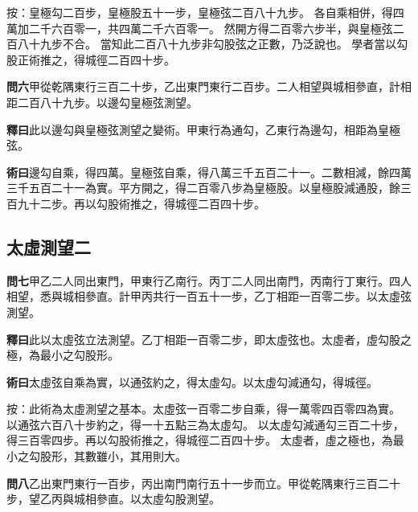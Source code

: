 \documentclass[12pt,a4paper]{article}
\newcommand{\Section}[1]{\subsection*{#1}}
\begin{document}
\noindent
按：皇極勾二百步，皇極股五十一步，皇極弦二百八十九步。
各自乘相併，得四萬加二千六百零一，共四萬二千六百零一。
然開方得二百零六步半，與皇極弦二百八十九步不合。
當知此二百八十九步非勾股弦之正數，乃泛說也。
學者當以勾股正術推之，得城徑二百四十步。

\vspace{0.5em}

\noindent\textbf{問六}\quad 甲從乾隅東行三百二十步，乙出東門東行二百步。二人相望與城相參直，計相距二百八十九步。以邊勾皇極弦測望。

\vspace{0.3em}

\noindent\textbf{釋曰}\quad 此以邊勾與皇極弦測望之變術。甲東行為通勾，乙東行為邊勾，相距為皇極弦。

\vspace{0.3em}

\noindent\textbf{術曰}\quad 邊勾自乘，得四萬。皇極弦自乘，得八萬三千五百二十一。二數相減，餘四萬三千五百二十一為實。平方開之，得二百零八步為皇極股。以皇極股減通股，餘三百九十二步。再以勾股術推之，得城徑二百四十步。

\Section{太虛測望二}

\noindent\textbf{問七}\quad 甲乙二人同出東門，甲東行乙南行。丙丁二人同出南門，丙南行丁東行。四人相望，悉與城相參直。計甲丙共行一百五十一步，乙丁相距一百零二步。以太虛弦測望。

\vspace{0.3em}

\noindent\textbf{釋曰}\quad 此以太虛弦立法測望。乙丁相距一百零二步，即太虛弦也。太虛者，虛勾股之極，為最小之勾股形。

\vspace{0.3em}

\noindent\textbf{術曰}\quad 太虛弦自乘為實，以通弦約之，得太虛勾。以太虛勾減通勾，得城徑。

\vspace{0.3em}

\noindent
按：此術為太虛測望之基本。太虛弦一百零二步自乘，得一萬零四百零四為實。
以通弦六百八十步約之，得一十五點三為太虛勾。
以太虛勾減通勾三百二十步，得三百零四步。再以勾股術推之，得城徑二百四十步。
太虛者，虛之極也，為最小之勾股形，其數雖小，其用則大。

\vspace{0.5em}

\noindent\textbf{問八}\quad 乙出東門東行一百步，丙出南門南行五十一步而立。甲從乾隅東行三百二十步，望乙丙與城相參直。以太虛勾股測望。
\end{document}
